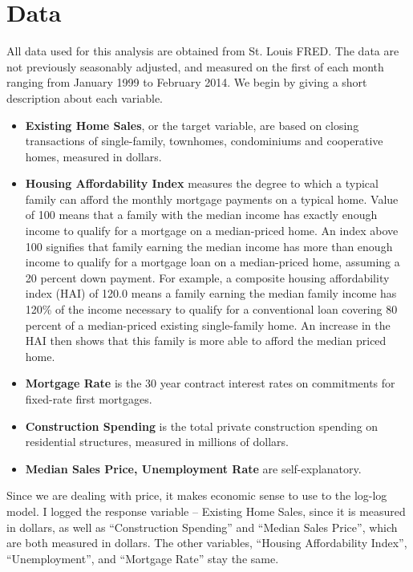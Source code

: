 \documentclass[a4 paper, 11 pt]{article}
\begin{document}
\section{Data}
All data used for this analysis are obtained from St. Louis FRED. The data are not previously seasonably adjusted, and measured on the first of each month ranging from January 1999 to February 2014. We begin by giving a short description about each variable.
\begin{itemize}
\item \textbf{Existing Home Sales}, or the target variable, are based on closing transactions of single-family, townhomes, condominiums and cooperative homes, measured in dollars.
\item \textbf{Housing Affordability Index} measures the degree to which a typical family can afford the monthly mortgage payments on a typical home. Value of 100 means that a family with the median income has exactly enough income to qualify for a mortgage on a median-priced home. An index above 100 signifies that family earning the median income has more than enough income to qualify for a mortgage loan on a median-priced home, assuming a 20 percent down payment. For example, a composite housing affordability index (HAI) of 120.0 means a family earning the median family income has 120\% of the income necessary to qualify for a conventional loan covering 80 percent of a median-priced existing single-family home. An increase in the HAI then shows that this family is more able to afford the median priced home.
\item \textbf{Mortgage Rate} is the 30 year contract interest rates on commitments for fixed-rate first mortgages.
\item \textbf{Construction Spending} is the total private construction spending on residential structures, measured in millions of dollars.
\item \textbf{Median Sales Price, Unemployment Rate} are self-explanatory.
\end{itemize}
Since we are dealing with price, it makes economic sense to use to the log-log model. I logged the response variable -- Existing Home Sales, since it is measured in dollars, as well as ``Construction Spending'' and ``Median Sales Price'', which are both measured in dollars. The other variables, ``Housing Affordability Index'', ``Unemployment'', and ``Mortgage Rate'' stay the same.
\end{document}
